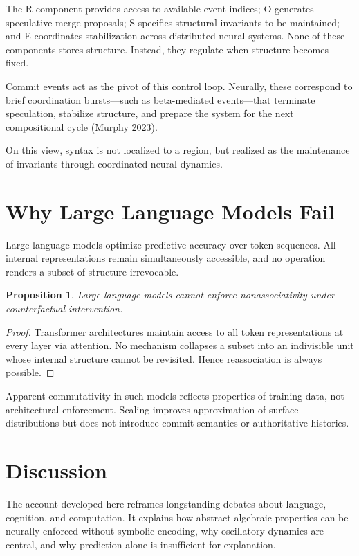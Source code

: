 \documentclass[11pt]{article}
\newtheorem{proposition}{Proposition}
\begin{document}
The R component provides access to available event indices; O generates speculative merge proposals; S specifies structural invariants to be maintained; and E coordinates stabilization across distributed neural systems. None of these components stores structure. Instead, they regulate when structure becomes fixed.

Commit events act as the pivot of this control loop. Neurally, these correspond to brief coordination bursts—such as beta-mediated events—that terminate speculation, stabilize structure, and prepare the system for the next compositional cycle (Murphy 2023).

On this view, syntax is not localized to a region, but realized as the maintenance of invariants through coordinated neural dynamics.

\section{Why Large Language Models Fail}

Large language models optimize predictive accuracy over token sequences. All internal representations remain simultaneously accessible, and no operation renders a subset of structure irrevocable.

\begin{proposition}
Large language models cannot enforce nonassociativity under counterfactual intervention.
\end{proposition}

\begin{proof}
Transformer architectures maintain access to all token representations at every layer via attention. No mechanism collapses a subset into an indivisible unit whose internal structure cannot be revisited. Hence reassociation is always possible.
\end{proof}

Apparent commutativity in such models reflects properties of training data, not architectural enforcement. Scaling improves approximation of surface distributions but does not introduce commit semantics or authoritative histories.

\section{Discussion}

The account developed here reframes longstanding debates about language, cognition, and computation. It explains how abstract algebraic properties can be neurally enforced without symbolic encoding, why oscillatory dynamics are central, and why prediction alone is insufficient for explanation.
\end{document}
